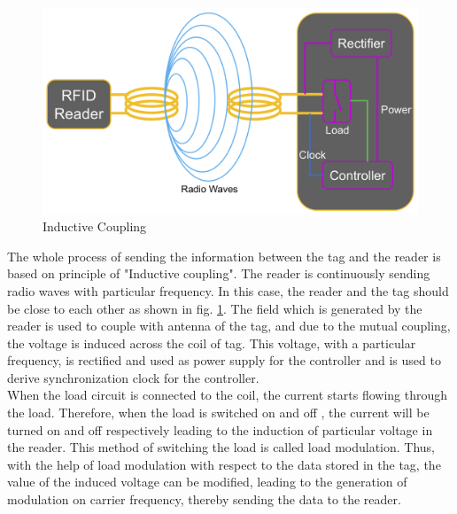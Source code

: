 \begin{figure}[!htbp]
	\centering
	\includegraphics[width = 13cm]{Pictures/rfidtotag}
	\caption{Inductive Coupling}
	\label{rfid_to_tag}
\end{figure}
The whole process of sending the information between the tag and the reader is based on principle of "Inductive coupling".
The reader is continuously sending radio waves with particular frequency. In this case, the reader and the tag should be close to each other as shown in fig. \ref{rfid_to_tag}. The field which is generated by the reader is used to  couple with antenna of the tag, and due to the mutual coupling, the voltage is induced across the coil of tag. This voltage, with a particular frequency, is rectified and used as power supply for the controller and is used to derive synchronization clock for the controller.\\
When the load circuit is connected to the coil, the current starts flowing through the load. Therefore, when the load is switched on and off , the current will be turned on and off respectively leading to the induction of particular voltage in the reader. This method of switching the load is called load modulation. Thus, with the help of load modulation with respect to the data stored in the tag, the value of the induced voltage can be modified, leading to the generation of modulation on carrier frequency, thereby sending the data to the reader.\\
